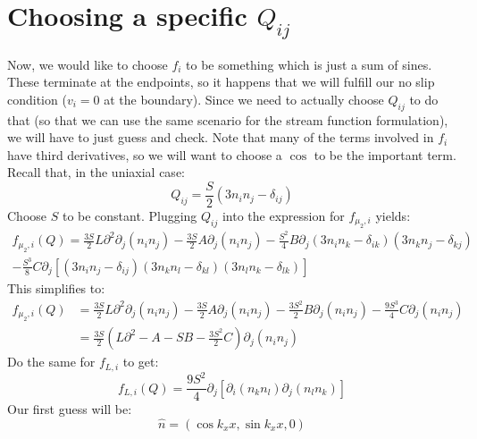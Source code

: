 \documentclass[reqno]{article}
\begin{document}
	\section{Choosing a specific $Q_{ij}$}
	Now, we would like to choose $f_i$ to be something which is just a sum of sines.
	These terminate at the endpoints, so it happens that we will fulfill our no slip condition ($v_i = 0$ at the boundary).
	Since we need to actually choose $Q_{ij}$ to do that (so that we can use the same scenario for the stream function formulation), we will have to just guess and check.
	Note that many of the terms involved in $f_i$ have third derivatives, so we will want to choose a $\cos$ to be the important term. 
	Recall that, in the uniaxial case:
	\begin{equation}
	Q_{ij} 
	= \frac{S}{2} \left( 3 n_i n_j - \delta_{ij} \right)
	\end{equation}
	Choose $S$ to be constant. 
	Plugging $Q_{ij}$ into the expression for $f_{\mu_2, i}$ yields:
	\begin{multline}
		f_{\mu_2, i} (Q)
		= \frac{3 S}{2} L \partial^2 \partial_j \left( n_i n_j \right)
		- \frac{3 S}{2} A \partial_j \left( n_i n_j \right)
		- \frac{S^2}{4} B \partial_j 
		\left( 3 n_i n_k - \delta_{ik} \right)
		\left( 3 n_k n_j - \delta_{kj} \right)\\
		- \frac{S^3}{8} C \partial_j
		\left[
		\left( 3 n_i n_j - \delta_{ij} \right)
		\left( 3 n_k n_l - \delta_{kl} \right)
		\left( 3 n_l n_k - \delta_{lk} \right)
		\right]
	\end{multline}
	This simplifies to:
	\begin{equation}
	\begin{split}
		f_{\mu_2, i} (Q)
		&= \frac{3 S}{2} L \partial^2 \partial_j \left( n_i n_j \right)
		- \frac{3 S}{2} A \partial_j \left( n_i n_j \right)
		- \frac{3 S^2}{2} B \partial_j \left( n_i n_j \right)
		- \frac{9 S^3}{4} C \partial_j
		\left( n_i n_j \right) \\
		&= \frac{3 S}{2} 
		\left(
		L \partial^2 - A - S B - \frac{3 S^2}{2} C
		\right)
		\partial_j \left( n_i n_j \right)
	\end{split}
	\end{equation}
	Do the same for $f_{L, i}$ to get:
	\begin{equation}
	f_{L, i} (Q) = \frac{9 S^2}{4} \partial_j 
	\left[
	\partial_i \left( n_k n_l \right)
	\partial_j \left( n_l n_k \right)
	\right]
	\end{equation}
	Our first guess will be:
	\begin{equation}
	\hat{n} = \left( \cos k_x x, \sin k_x x, 0 \right)
	\end{equation}
\end{document}
